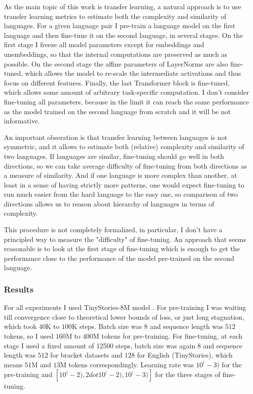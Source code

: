 \documentclass[a4paper, 11pt, oneside]{article}
\begin{document}
	As the main topic of this work is transfer learning, a natural approach is to
	use transfer learning metrics to estimate both the complexity and similarity
	of languages. For a given language pair I pre-train a language model on the first
	language and then fine-tune it on the second language, in several stages. On the
	first stage I freeze all model parameters except for embeddings and unembeddings,
	so that the internal computations are preserved as much as possible. On the second
	stage the affine parameters of LayerNorms are also fine-tuned, which allows
	the model to re-scale the intermediate activations and thus focus on different
	features. Finally, the last Transformer block is fine-tuned, which allows some
	amount of arbitrary task-specific computation. I don't consider fine-tuning
	all parameters, because in the limit it can reach the same performance as the model
	trained on the second language from scratch and it will be not informative.

	An important obseration is that transfer learning between languages is not symmetric,
	and it allows to estimate both (relative) complexity and similarity of two
	languages. If languages are similar, fine-tuning should go well in both
	directions, so we can take average difficulty of fine-tuning from both directions
	as a measure of similarity. And if one language is more complex than another, at
	least in a sense of having strictly more patterns, one would expect fine-tuning
	to run much easier from the hard language to the easy one, so comparison of two
	directions allows us to reason about hierarchy of languages in terms of complexity.

	This procedure is not completely formalized, in particular, I don't have a principled
	way to measure the "difficulty" of fine-tuning. An approach that seems
	reasonable is to look at the first stage of fine-tuning which is enough to get
	the performance close to the performance of the model pre-trained on the
	second language.

	\subsubsection{Results}
	For all experiments I used TinyStories-8M model \cite{eldan2023tinystories}. For
	pre-training I was waiting till convergence close to theoretical lower bounds of
	loss, or just long stagnation, which took $40$K to $100$K steps. Batch size
	was $8$ and sequence length was $512$ tokens, so I used $160$M to $400$M tokens
	for pre-training. For fine-tuning, at each stage I used a fixed amount of 12500
	steps, batch size was again $8$ and sequence length was $512$ for bracket
	datasets and $128$ for English (TinyStories), which means $51$M and $13$M tokens
	correspondingly. Learning rate was $10^{(}-3)$ for the pre-training and
	$[10^{(}-2), 2 dot 10^{(}-2), 10^{(}-3)]$ for the three stages of fine-tuning.
\end{document}

